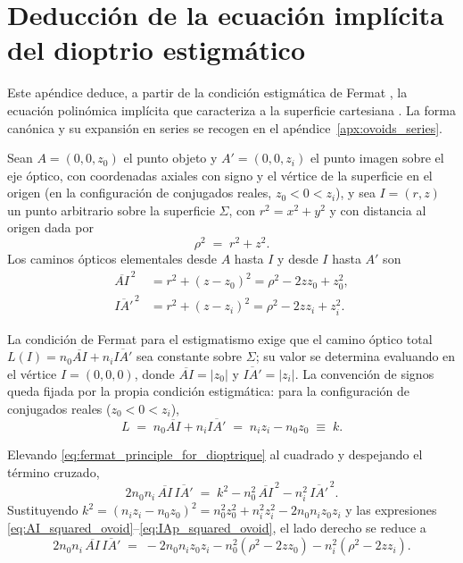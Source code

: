 \chapter{Deducción de la ecuación implícita del dioptrio estigmático}
\label{apx:ovoid_implicit_deduction}

Este apéndice deduce, a partir de la condición estigmática de Fermat
\cite{fermat1891oeuvres}, la ecuación polinómica implícita que caracteriza a
la superficie cartesiana \cite{dioptrique}. La forma canónica y su expansión
en series se recogen en el apéndice~\ref{apx:ovoids_series}.

\medskip

Sean $A=(0,0,z_0)$ el punto objeto y $A'=(0,0,z_i)$ el punto imagen sobre el
eje óptico, con coordenadas axiales con signo y el vértice de la superficie
en el origen (en la configuración de conjugados reales, $z_0<0<z_i$), y sea
$I=(r,z)$ un punto arbitrario sobre la superficie $\Sigma$, con $r^2=x^2+y^2$
y con distancia al origen dada por
\begin{equation}
\rho^2\;=\;r^2+z^2.
\label{eq:rho_definition_ovoid}
\end{equation}
Los caminos ópticos elementales desde $A$ hasta $I$ y desde $I$ hasta $A'$
son
\begin{align}
\overline{AI}^{\,2}
&= r^2+(z-z_0)^2
= \rho^2-2zz_0+z_0^2,
\label{eq:AI_squared_ovoid}
\\[4pt]
\overline{IA'}^{\,2}
&= r^2+(z-z_i)^2
= \rho^2-2zz_i+z_i^2.
\label{eq:IAp_squared_ovoid}
\end{align}

La condición de Fermat para el estigmatismo exige que el camino óptico total
$L(I)=n_0\overline{AI}+n_i\overline{IA'}$ sea constante sobre $\Sigma$; su
valor se determina evaluando en el vértice $I=(0,0,0)$, donde
$\overline{AI}=|z_0|$ y $\overline{IA'}=|z_i|$. La convención de signos queda
fijada por la propia condición estigmática: para la configuración de
conjugados reales ($z_0<0<z_i$),
\begin{equation}
L\;=\;n_0\overline{AI}+n_i\overline{IA'}
\;=\;n_iz_i-n_0z_0
\;\equiv\;k.
\label{eq:fermat_principle_for_dioptrique}
\end{equation}

Elevando \eqref{eq:fermat_principle_for_dioptrique} al cuadrado y despejando
el término cruzado,
\begin{equation}
2n_0n_i\,\overline{AI}\,\overline{IA'}
\;=\;
k^2-n_0^2\,\overline{AI}^{\,2}-n_i^2\,\overline{IA'}^{\,2}.
\label{eq:fermat_squared_once}
\end{equation}
Sustituyendo $k^2=(n_iz_i-n_0z_0)^2=n_0^2z_0^2+n_i^2z_i^2-2n_0n_iz_0z_i$ y
las expresiones \eqref{eq:AI_squared_ovoid}--\eqref{eq:IAp_squared_ovoid}, el
lado derecho se reduce a
\begin{equation}
2n_0n_i\,\overline{AI}\,\overline{IA'}
\;=\;
-2n_0n_iz_0z_i
-n_0^2(\rho^2-2zz_0)
-n_i^2(\rho^2-2zz_i).
\label{eq:fermat_squared_once_reduced}
\end{equation}

